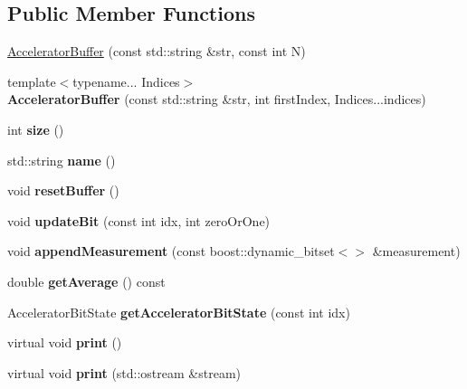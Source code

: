 \subsection*{Public Member Functions}
\begin{DoxyCompactItemize}
\item 
\hyperlink{a00019_ab606d8af942120d60b51a4fffcd75c98}{Accelerator\+Buffer} (const std\+::string \&str, const int N)
\item 
{\footnotesize template$<$typename... Indices$>$ }\\{\bfseries Accelerator\+Buffer} (const std\+::string \&str, int first\+Index, Indices...\+indices)\hypertarget{a00019_ac550d89390562095c56aa1b14ae85001}{}\label{a00019_ac550d89390562095c56aa1b14ae85001}

\item 
int {\bfseries size} ()\hypertarget{a00019_aa2a3101c2e3ae3550172bf49f9587f3b}{}\label{a00019_aa2a3101c2e3ae3550172bf49f9587f3b}

\item 
std\+::string {\bfseries name} ()\hypertarget{a00019_ad5b646e9efc21b6d0bcc22cd6f649c22}{}\label{a00019_ad5b646e9efc21b6d0bcc22cd6f649c22}

\item 
void {\bfseries reset\+Buffer} ()\hypertarget{a00019_aa6d6e9cfee6170333c1f03507345743f}{}\label{a00019_aa6d6e9cfee6170333c1f03507345743f}

\item 
void {\bfseries update\+Bit} (const int idx, int zero\+Or\+One)\hypertarget{a00019_a4bc0edbe9aa0d463f67ddcc38265066f}{}\label{a00019_a4bc0edbe9aa0d463f67ddcc38265066f}

\item 
void {\bfseries append\+Measurement} (const boost\+::dynamic\+\_\+bitset$<$$>$ \&measurement)\hypertarget{a00019_ac161c4f984f774d08197871094aabc67}{}\label{a00019_ac161c4f984f774d08197871094aabc67}

\item 
double {\bfseries get\+Average} () const \hypertarget{a00019_a97cf3cc4e1aaa8ac3cee7817860f77c1}{}\label{a00019_a97cf3cc4e1aaa8ac3cee7817860f77c1}

\item 
Accelerator\+Bit\+State {\bfseries get\+Accelerator\+Bit\+State} (const int idx)\hypertarget{a00019_aba6ef359f3117faa98f0eb8da90d909e}{}\label{a00019_aba6ef359f3117faa98f0eb8da90d909e}

\item 
virtual void {\bfseries print} ()\hypertarget{a00019_add0835e188f0eda4f1b68a28ddc79786}{}\label{a00019_add0835e188f0eda4f1b68a28ddc79786}

\item 
virtual void {\bfseries print} (std\+::ostream \&stream)\hypertarget{a00019_a7c59462451223772b41ef232b06a7dfa}{}\label{a00019_a7c59462451223772b41ef232b06a7dfa}

\end{DoxyCompactItemize}
